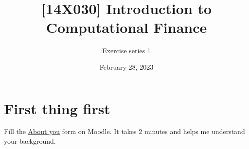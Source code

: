 \documentclass[12pt]{article}
\title{[14X030] Introduction to Computational Finance}
\author{Exercise series 1}
\date{\small February 28, 2023}
\begin{document}
 

\maketitle 



\newpage

\section*{First thing first}

Fill the \href{https://moodle.unige.ch/mod/questionnaire/view.php?id=571682}{About you} form on Moodle. It takes 2 minutes and helps me understand your background. 




\end{document}
